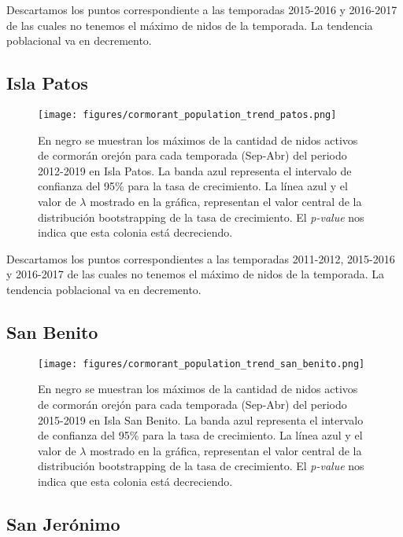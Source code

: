 \documentclass{article} %
\begin{document}
Descartamos los puntos correspondiente a las temporadas 2015-2016 y 2016-2017 de las cuales no tenemos el máximo de nidos de la temporada. La tendencia poblacional va en decremento.


\subsection*{Isla Patos}

\begin{figure}[H]
\hspace{-2cm}
    \texttt{[image: figures/cormorant\_population\_trend\_patos.png]}
\caption{En negro se muestran los máximos de la cantidad de nidos activos de cormorán orejón para cada temporada (Sep-Abr) del periodo 2012-2019 en Isla Patos. La banda azul representa el intervalo de confianza del 95\% para la tasa de crecimiento. La línea azul y el valor de $\lambda$ mostrado en la gráfica, representan el valor central de la distribución bootstrapping de la tasa de crecimiento. El \textit{p-value} nos indica que esta colonia está decreciendo.}
\end{figure}

Descartamos los puntos correspondientes a las temporadas 2011-2012, 2015-2016 y 2016-2017 de las cuales no tenemos el máximo de nidos de la temporada. La tendencia poblacional va en decremento.

\subsection*{San Benito}

\begin{figure}[H]
\hspace{-2cm}
    \texttt{[image: figures/cormorant\_population\_trend\_san\_benito.png]}
\caption{En negro se muestran los máximos de la cantidad de nidos activos de cormorán orejón para cada temporada (Sep-Abr) del periodo 2015-2019 en Isla San Benito. La banda azul representa el intervalo de confianza del 95\% para la tasa de crecimiento. La línea azul y el valor de $\lambda$ mostrado en la gráfica, representan el valor central de la distribución bootstrapping de la tasa de crecimiento. El \textit{p-value} nos indica que esta colonia está decreciendo.}
\end{figure}

\subsection*{San Jerónimo}
\end{document}
